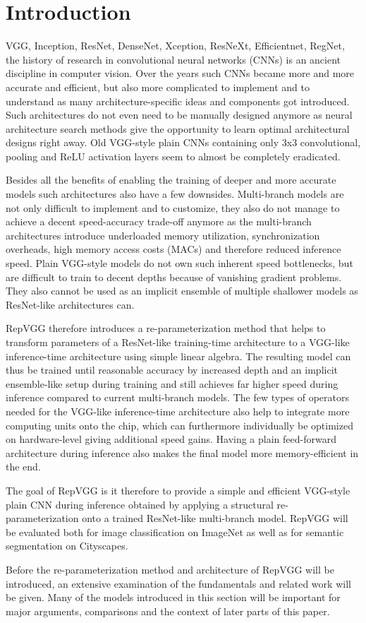 \section{Introduction}

VGG, Inception, ResNet, DenseNet, Xception, ResNeXt, Efficientnet, RegNet, the history of research in convolutional neural networks (CNNs) is an ancient discipline in computer vision. Over the years such CNNs became more and more accurate and efficient, but also more complicated to implement and to understand as many architecture-specific ideas and components got introduced. Such architectures do not even need to be manually designed anymore as neural architecture search methods give the opportunity to learn optimal architectural designs right away. Old VGG-style plain CNNs containing only 3x3 convolutional, pooling and ReLU activation layers seem to almost be completely eradicated. 

Besides all the benefits of enabling the training of deeper and more accurate models such architectures also have a few downsides. Multi-branch models are not only difficult to implement and to customize, they also do not manage to achieve a decent speed-accuracy trade-off anymore as the multi-branch architectures introduce underloaded memory utilization, synchronization overheads, high memory access costs (MACs) and therefore reduced inference speed. Plain VGG-style models do not own such inherent speed bottlenecks, but are difficult to train to decent depths because of vanishing gradient problems. They also cannot be used as an implicit ensemble of multiple shallower models as ResNet-like architectures can. 

RepVGG therefore introduces a re-parameterization method that helps to transform parameters of a ResNet-like training-time architecture to a VGG-like inference-time architecture using simple linear algebra. The resulting model can thus be trained until reasonable accuracy by increased depth and an implicit ensemble-like setup during training and still achieves far higher speed during inference compared to current multi-branch models. The few types of operators needed for the VGG-like inference-time architecture also help to integrate more computing units onto the chip, which can furthermore individually be optimized on hardware-level giving additional speed gains. Having a plain feed-forward architecture during inference also makes the final model more memory-efficient in the end. 

The goal of RepVGG is it therefore to provide a simple and efficient VGG-style plain CNN during inference obtained by applying a structural re-parameterization onto a trained ResNet-like multi-branch model. RepVGG will be evaluated both for image classification on ImageNet as well as for semantic segmentation on Cityscapes. 

Before the re-parameterization method and architecture of RepVGG will be introduced, an extensive examination of the fundamentals and related work will be given. Many of the models introduced in this section will be important for major arguments, comparisons and the context of later parts of this paper. 
 